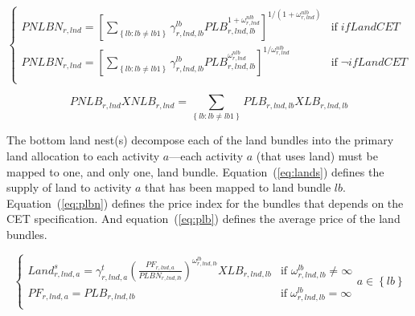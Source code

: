 \documentclass[11pt,letterpaper]{report}
\begin{document}
\begin{equation}
\label{eq:pnlbn}
\begin{cases}
   \mathit{PNLBN}_{r,\mathit{lnd}} =
      \displaystyle
         \left[
            \sum_{\left\{ \mathit{lb}: \mathit{lb} \ne {\mathit{lb1}}\right\}} {
               \gamma^{\mathit{lb}}_{r,\mathit{lnd},\mathit{lb}}
               \mathit{PLB}_{r,\mathit{lnd},\mathit{lb}}^{1+\omega^{\mathit{nlb}}_{r,\mathit{lnd}}}
            }
         \right]^{{1}/{(1+\omega^{\mathit{nlb}}_{r,\mathit{lnd}})}}
      & \textrm{if} \; \mathit{ifLandCET} \\
   \mathit{PNLBN}_{r,\mathit{lnd}} =
      \displaystyle
         \left[
            \sum_{\left\{\mathit{lb}:\mathit{lb} \ne {\mathit{lb1}}\right\}} {
               \gamma^{\mathit{lb}}_{r,\mathit{lnd},\mathit{lb}}
               \mathit{PLB}_{r,\mathit{lnd},\mathit{lb}}^{\omega^{\mathit{nlb}}_{r,\mathit{lnd}}}
            }
         \right]^{{1}/{\omega^{\mathit{nlb}}_{r,\mathit{lnd}}}}
      & \textrm{if} \; \neg \mathit{ifLandCET} \\
\end{cases}
\end{equation}

\begin{equation}
\label{eq:pnlb}
\mathit{PNLB_{r,\mathit{lnd}}} \mathit{XNLB_{r,\mathit{lnd}}} =
   \sum_{\left\{ \mathit{lb}: \mathit{lb} \ne \mathit{lb1} \right\} }{
   \mathit{PLB}_{r,\mathit{lnd},\mathit{lb}} \mathit{XLB}_{r,\mathit{lnd},\mathit{lb}}}
\end{equation}

The bottom land nest(s) decompose each of the land bundles into the primary land
allocation to each activity $a$---each activity $a$ (that uses land) must be
mapped to one, and only one, land bundle. Equation~(\ref{eq:lands}) defines the
supply of land to activity $a$ that has been mapped to land bundle
$\mathit{lb}$. Equation~(\ref{eq:plbn}) defines the price index for the bundles
that depends on the CET specification. And equation~(\ref{eq:plb}) defines the
average price of the land bundles.

\begin{equation}
\label{eq:lands}
\begin{cases}
   \displaystyle \mathit{Land}^s_{r,\mathit{lnd},a} =
      \gamma^{t}_{r,\mathit{lnd},a}
      \left( \frac {\mathit{PF}_{r,\mathit{lnd},a}}
         {\mathit{PLBN}_{r,\mathit{lnd},\mathit{lb}}}
      \right)^{\omega^{\mathit{lb}}_{r,\mathit{lnd},\mathit{lb}}}
      \mathit{XLB}_{r,\mathit{lnd},\mathit{lb}}
   & \textrm{if } \omega^{\mathit{lb}}_{r,\mathit{lnd},\mathit{lb}} \ne \infty \\
   \displaystyle \mathit{PF}_{r,\mathit{lnd},a} = \mathit{PLB}_{r,\mathit{lnd},\mathit{lb}}
   & \textrm{if} \; \omega^{\mathit{lb}}_{r,\mathit{lnd},\mathit{lb}} = \infty \\
\end{cases} {a \in \left\{ \mathit{lb} \right\}}
\end{equation}
\end{document}
